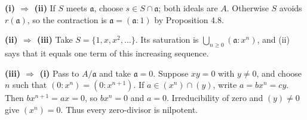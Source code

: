 \textbf{(i) $\Rightarrow$ (ii)} If $S$ meets $\mathfrak{a}$, choose $s\in S\cap\mathfrak{a}$; both ideals are $A$. Otherwise $S$ avoids $r(\mathfrak{a})$, so the contraction is $\mathfrak{a}=(\mathfrak{a}:1)$ by Proposition 4.8.

\textbf{(ii) $\Rightarrow$ (iii)} Take $S=\{1,x,x^2,\ldots\}$. Its saturation is $\bigcup_{n\ge0}(\mathfrak{a}:x^n)$, and (ii) says that it equals one term of this increasing sequence.

\textbf{(iii) $\Rightarrow$ (i)} Pass to $A/\mathfrak{a}$ and take $\mathfrak{a}=0$. Suppose $xy=0$ with $y\ne0$, and choose $n$ such that $(0:x^n)=(0:x^{n+1})$. If $a\in(x^n)\cap(y)$, write $a=bx^n=cy$. Then $bx^{n+1}=ax=0$, so $bx^n=0$ and $a=0$. Irreducibility of zero and $(y)\ne0$ give $(x^n)=0$. Thus every zero-divisor is nilpotent.
